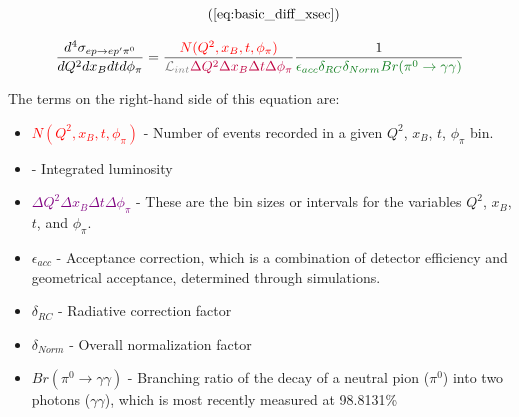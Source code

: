         \begin{equation*}
          \recallLabel{eq:basic_diff_xsec}
        \end{equation*}
  
       
             \begin{equation}\labelAndRemember{eq:DVPiPCrossSection_exp}
                   { \frac{    d^4\sigma_{  ep \rightarrow ep'\pi^0}   } {dQ^2dx_Bdtd\phi_{\pi}} 
                        =   \frac{ \textcolor{red}{ N(Q^2,x_B,t,\phi_{\pi})}} {\Lumiint \textcolor{purple}{ \Delta Q^2 \Delta x_B \Delta t \Delta \phi_{\pi}}} 
                        \frac{1}{\textcolor{correctionfactors}{\epsilon_{acc} \delta_{RC} \delta_{Norm} Br(\pi^0\rightarrow\gamma\gamma)}}}
             \end{equation}      
        
        The terms on the right-hand side of this equation are: 
        \begin{itemize}
        \item \textcolor{red}{$N(Q^2,x_B,t,\phi_{\pi})$} - Number of events recorded in a given $Q^2$, $x_B$, $t$, $\phi_{\pi}$ bin.
        
        \item \Lumiint - Integrated luminosity
        
        \item \textcolor{purple}{$\Delta Q^2 \Delta x_B \Delta t \Delta \phi_{\pi}$} - These are the bin sizes or intervals for the variables $Q^2$, $x_B$, $t$, and $\phi_{\pi}$.
        
        \item \textcolor{correctionfactors}{$\epsilon_{acc}$} - Acceptance correction, which is a combination of detector efficiency and geometrical acceptance, determined through simulations. 
        
        \item \textcolor{correctionfactors}{$\delta_{RC}$} - Radiative correction factor
        
        \item \textcolor{correctionfactors}{$\delta_{Norm}$} - Overall normalization factor
        
        \item \textcolor{correctionfactors}{$Br(\pi^0\rightarrow\gamma\gamma)$} - Branching ratio of the decay of a neutral pion ($\pi^0$) into two photons ($\gamma\gamma$), which is most recently measured at 98.8131\%  \parencite{Husek2019PreciseDecay}
        \end{itemize}

